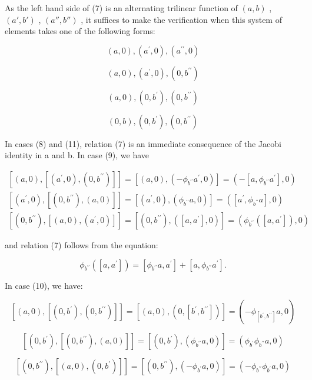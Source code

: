 As the left hand side of (7) is an alternating trilinear function of \((a, b)\) , \((a', b')\) , \((a'', b'')\) , it suffices to make the verification when this system of elements takes one of the following forms:

\[
(a, 0), (a ^ {\prime}, 0), (a ^ {\prime \prime}, 0)\tag{8}
\]

\[
(a, 0), (a ^ {\prime}, 0), (0, b ^ {\prime \prime})\tag{9}
\]

\[
(a, 0), (0, b ^ {\prime}), (0, b ^ {\prime \prime})\tag{10}
\]

\[
(0, b), (0, b ^ {\prime}), (0, b ^ {\prime \prime})\tag{11}
\]

In cases (8) and (11), relation (7) is an immediate consequence of the Jacobi identity in a and b. In case (9), we have

\[
\begin{array}{l} [ (a, 0), [ (a ^ {\prime}, 0), (0, b ^ {\prime \prime}) ] ] = [ (a, 0), (- \phi_ {b ^ {\prime \prime}} a ^ {\prime}, 0) ] = (- [ a, \phi_ {b ^ {\prime \prime}} a ^ {\prime} ], 0) \\ {} [ (a ^ {\prime}, 0), [ (0, b ^ {\prime \prime}), (a, 0) ] ] = [ (a ^ {\prime}, 0), (\phi_ {b ^ {\prime \prime}} a, 0) ] = ([ a ^ {\prime}, \phi_ {b ^ {\prime \prime}} a ], 0) \\ {} [ (0, b ^ {\prime \prime}), [ (a, 0), (a ^ {\prime}, 0) ] ] = [ (0, b ^ {\prime \prime}), ([ a, a ^ {\prime} ], 0) ] = (\phi_ {b ^ {\prime \prime}} ([ a, a ^ {\prime} ]), 0) \end{array}
\]

and relation (7) follows from the equation:

\[
\phi_ {b ^ {\prime \prime}} ([ a, a ^ {\prime} ]) = [ \phi_ {b ^ {\prime \prime}} a, a ^ {\prime} ] + [ a, \phi_ {b ^ {\prime \prime}} a ^ {\prime} ].
\]

In case (10), we have:

\[
[ (a, 0), [ (0, b ^ {\prime}), (0, b ^ {\prime \prime}) ] ] = [ (a, 0), (0, [ b ^ {\prime}, b ^ {\prime \prime} ]) ] = (- \phi_ {[ b ^ {\prime}, b ^ {\prime \prime} ]} a, 0)
\]

\[
[ (0, b ^ {\prime}), [ (0, b ^ {\prime \prime}), (a, 0) ] ] = [ (0, b ^ {\prime}), (\phi_ {b ^ {\prime \prime}} a, 0) ] = (\phi_ {b ^ {\prime}} \phi_ {b ^ {\prime \prime}} a, 0)
\]

\[
[ (0, b ^ {\prime \prime}), [ (a, 0), (0, b ^ {\prime}) ] ] = [ (0, b ^ {\prime \prime}), (- \phi_ {b ^ {\prime}} a, 0) ] = (- \phi_ {b ^ {\prime \prime}} \phi_ {b ^ {\prime}} a, 0)
\]

